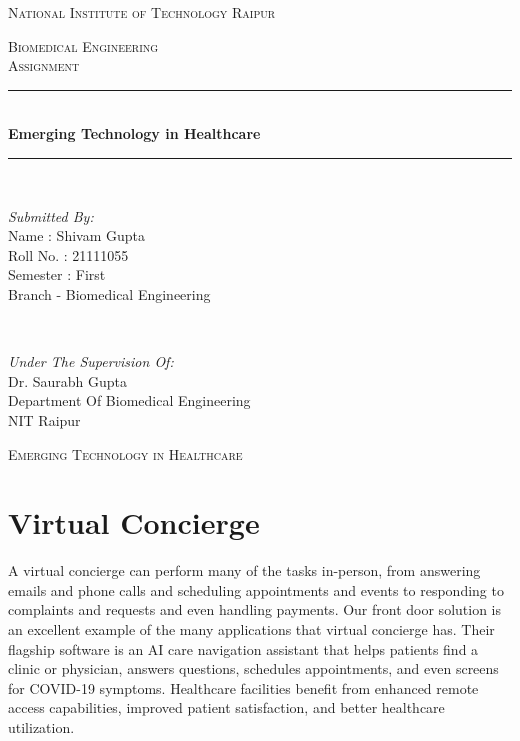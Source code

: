 \documentclass[12pt]{article}
\begin{document}
\begin{titlepage}
\newcommand{\HRule}{\rule{\linewidth}{0.5mm}}
\center
\textsc{\LARGE National Institute of Technology Raipur}\\[1.0cm]
\begin{figure}[h]
\centering
\end{figure}
\textsc{\Large Biomedical Engineering}\\[0.5cm] 
\textsc{\large Assignment}\\[0.5cm]
\HRule\\[0.4cm]
	
	{\huge\bfseries Emerging Technology in Healthcare }\\[0.1cm]
	\HRule\\[1.1cm]
	\begin{minipage}{0.4\textwidth}
		\begin{flushleft}
			\large
			\textit{Submitted By:}\\
          		Name : Shivam Gupta \\
			   Roll No. : 21111055\\
			   Semester : First\\
			   Branch - Biomedical Engineering 
			   
			\end{flushleft}
	\end{minipage}
	~
	\begin{minipage}{0.5\textwidth}
		\begin{flushright}
			\large
			\textit{Under The Supervision Of:}\\
			Dr. Saurabh Gupta\\
			Department Of Biomedical Engineering\\
			NIT Raipur
		\end{flushright}
	\end{minipage}
	\vfill\vfill\vfill 
	
	
	\vfill 
\end{titlepage}


\clearpage
\newpage
\textsc{\Large Emerging Technology in Healthcare}\\[0.1cm]


\section*{Virtual Concierge}
A virtual concierge can perform many of the tasks in-person, from answering emails and phone calls and scheduling appointments and events to responding to complaints and requests and even handling payments. Our front door solution is an excellent example of the many applications that virtual concierge has. Their flagship software is an AI care navigation assistant that helps patients find a clinic or physician, answers questions, schedules appointments, and even screens for COVID-19 symptoms. Healthcare facilities benefit from enhanced remote access capabilities, improved patient satisfaction, and better healthcare utilization. 
\end{document}
